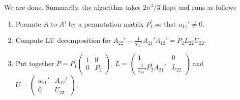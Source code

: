 \documentclass[12pt]{amsart}
\theoremstyle{definition}
\begin{document}
We are done. Summarily, the algorithm takes $2n^3/3$ flops and runs as follows
\begin{enumerate}[\indent 1.]
\item Permute $A$ to $A'$ by a permutation matrix $P_1^t$ so that $a_{11}' \neq 0$.
\item Compute LU decomposition for $A_{22}' - \frac{1}{a_{11}'} A_{21}' A_{12}' = P_2L_{22}U_{22}$.
\item Put together $P = P_1 \left(\begin{array}{cc} 1 & 0 \\ 0 & P_2  \end{array}\right)$, $L = \left(\begin{array}{cc} 1 & 0 \\ \frac{1}{a_{11}'} P^t_2 A_{21}' & L_{22}  \end{array}\right)$ and $U = \left(\begin{array}{cc} a_{11}' & A_{12}' \\ 0 & U_{22} \end{array}\right)$.
\end{enumerate}
\end{document}
